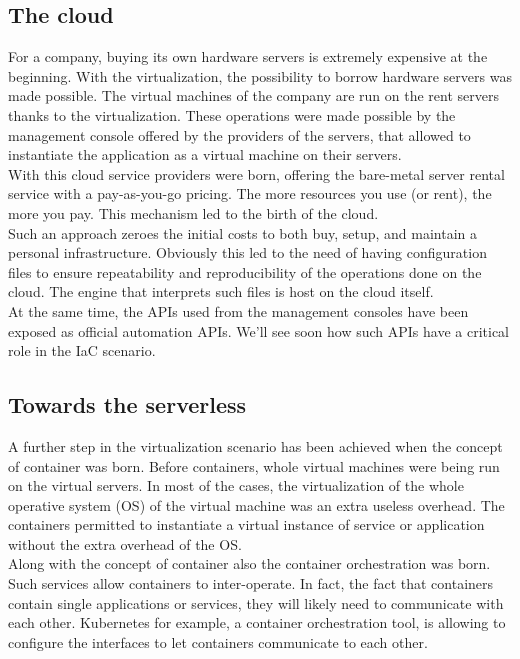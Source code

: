 \subsection{The cloud}
For a company, buying its own hardware servers is extremely expensive at the beginning.
With the virtualization, the possibility to borrow hardware servers was made possible.
The virtual machines of the company are run on the rent servers thanks to the virtualization.
These operations were made possible by the management console offered by the providers of the servers, that allowed to instantiate the application as a virtual machine on their servers.\\
With this cloud service providers were born, offering the bare-metal server rental service with a pay-as-you-go pricing.
The more resources you use (or rent), the more you pay.
This mechanism led to the birth of the cloud.\\
Such an approach zeroes the initial costs to both buy, setup, and maintain a personal infrastructure.
Obviously this led to the need of having configuration files to ensure repeatability and reproducibility of the operations done on the cloud.
The engine that interprets such  files is host on the cloud itself.\\
At the same time, the APIs used from the management consoles have been exposed as official automation APIs.
We'll see soon how such APIs have a critical role in the IaC scenario.

\subsection{Towards the serverless}
A further step in the virtualization scenario has been achieved when the concept of container was born.
Before containers, whole virtual machines were being run on the virtual servers.
In most of the cases, the virtualization of the whole operative system (OS) of the virtual machine was an extra useless overhead.
The containers permitted to instantiate a virtual instance of service or application without the extra overhead of the OS.\\
Along with the concept of container also the container orchestration was born.
Such services allow containers to inter-operate.
In fact, the fact that containers contain single applications or services, they will likely need to communicate with each other.
Kubernetes for example, a container orchestration tool, is allowing to configure the interfaces to let containers communicate to each other.

